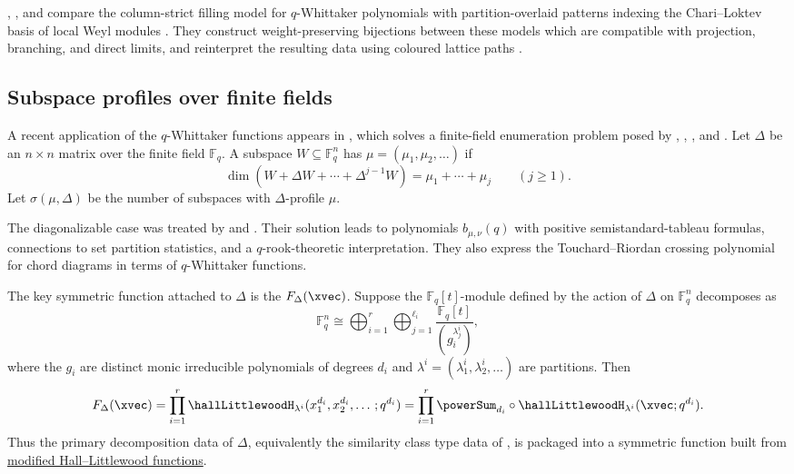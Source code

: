 , , and
 compare the column-strict filling model for
$q$-Whittaker polynomials with partition-overlaid patterns indexing the
Chari--Loktev basis of local Weyl modules
\cite{BhattacharyaRatheeshViswanath2024x}.  They construct
weight-preserving bijections between these models which are compatible with
projection, branching, and direct limits, and reinterpret the resulting data
using coloured lattice paths \cite[Thm.~2]{BhattacharyaRatheeshViswanath2024x}.


\subsection[subspaceProfiles]{Subspace profiles over finite fields}

A recent application of the $q$-Whittaker functions appears in
\cite{Ram2026}, which solves a finite-field enumeration problem
posed by , , , and
 \cite{BenderColeyRobbinsRumsey1992}.  Let $\Delta$ be
an $n \times n$ matrix over the finite field $\mathbb{F}_q$.  A subspace
$W \subseteq \mathbb{F}_q^n$ has 
\label{deltaProfile}
$\mu=(\mu_1,\mu_2,\dotsc)$ if
\[
\dim(W+\Delta W+\cdots+\Delta^{j-1}W)=\mu_1+\cdots+\mu_j
\qquad (j \geq 1).
\]
Let $\sigma(\mu,\Delta)$ be the number of subspaces with $\Delta$-profile
$\mu$.

The diagonalizable case was treated by  and
 \cite{RamSchlosser2026}.  Their solution leads to
polynomials $b_{\mu,\nu}(q)$ with positive semistandard-tableau formulas,
connections to set partition statistics, and a $q$-rook-theoretic
interpretation.  They also express the Touchard--Riordan crossing polynomial
for chord diagrams in terms of $q$-Whittaker functions.

The key symmetric function attached to $\Delta$ is the
\label{invariantFlagGeneratingFunction}
$F_\Delta(\xvec)$.  Suppose the
$\mathbb{F}_q[t]$-module defined by the action of $\Delta$ on
$\mathbb{F}_q^n$ decomposes as
\[
\mathbb{F}_q^n \cong
\bigoplus_{i=1}^r \bigoplus_{j=1}^{\ell_i}
\frac{\mathbb{F}_q[t]}{(g_i^{\lambda^i_j})},
\]
where the $g_i$ are distinct monic irreducible polynomials of degrees $d_i$
and $\lambda^i=(\lambda^i_1,\lambda^i_2,\dotsc)$ are partitions. Then
\[
F_\Delta(\xvec)=
\prod_{i=1}^r
\hallLittlewoodH_{\lambda^i}(x_1^{d_i},x_2^{d_i},\dotsc;q^{d_i})
=
\prod_{i=1}^r
\powerSum_{d_i}\circ \hallLittlewoodH_{\lambda^i}(\xvec;q^{d_i}).
\]
Thus the primary decomposition data of $\Delta$, equivalently the similarity
class type data of  \cite{Green1955}, is packaged into a
symmetric function built from
\hyperref[hallLittlewoodH]{modified Hall--Littlewood functions}.

